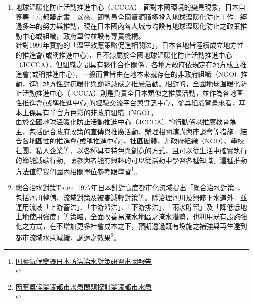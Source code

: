 \documentclass[a4paper,12pt]{article}
\begin{document}
\begin{enumerate}
\item 地球溫暖化防止活動推進中心（JCCCA）
\label{sec:org3282081}
面對本國環境的變異現象，日本自簽署「京都議定書」以來，即動員全國資源積極投入地球溫暖化防止工作，經過多年的努力與推動，現在日本國內各大城市均設有地球溫暖化防止之政策推動中心或組織，政府單位並設有專責機構。\\

針對1999年實施的「溫室效應策略促進相關法」，日本各地皆陸續成立地方性的推進會(或稱推進中心)，且不隸屬於全國地球溫暖化防止活動推進中心（JCCCA），但組織之間具有夥伴合作關係。各地方政府依規定在地方成立推進會(或稱推進中心)，一般而言皆由在地本來就存在的非政府組織（NGO）推動，進行地方性對抗暖化與節能減碳之推廣活動。相對的，全國地球溫暖化防止活動推進中心（JCCCA）則是負責全日本類似之推廣活動，並作為各地區性推進會(或稱推進中心)的經驗交流平台與資訊中心，從其組織背景來看，基本上係具有半官方色彩的非政府組織（NGO）。\\

由於全國地球溫暖化防止活動推進中心（JCCCA）的行動係以推廣教育為主，包括配合政府政策的宣傳與推廣活動、辦理相關演講與座談會等措施，結合各地區性的推進會(或稱推進中心)、社區團體、非政府組織（NGO）、學校社團、私人企業等，以各種具有特色與創意的方式，且可以從生活中確實執行的節能減碳行動，讓參與者能有興趣的可以從活動中學習各種知識，這種推動方法值得我們國內相關單位參考跟學習\footnote{\href{https://www.google.com/url?sa=t\&rct=j\&q=\&esrc=s\&source=web\&cd=\&ved=2ahUKEwib2OL31MLvAhVyF6YKHcy4Cp4QFjABegQIBhAD\&url=https\%3A\%2F\%2Fws.ndc.gov.tw\%2FDownload.ashx\%3Fu\%3DLzAwMS9hZG1pbmlzdHJhdG9yLzEwL3JlbGZpbGUvNTY1OC80MjUxLzgyOTIyN2QzLTA4MDYtNDBjYS04MGMwLTQyMzA3MmZjM2I3ZC5wZGY\%253D\%26n\%3DOTgwNzA15Zug5oeJ5rCj5YCZ6K6K6YG35pel5pys6Ziy5rSq5rK75rC05bCN562WLnBkZg\%253D\%253D\%26icon\%3D..pdf\&usg=AOvVaw2xKxAX\_XQpcGVM6dD17x9d}{因應氣候變遷日本防洪治水對策研習出國報告}\\\label{org57dc3d8}}。\\

\item 總合治水對策\hfill{}\textsc{Taipei}
\label{sec:orgdd90044}
1977年日本針對高度都市化流域提出「總合治水對策」，包括河川整備、流域對策及被害減輕對策等。除治理河川及興修下水道外，並運用流域「上游蓄洪」、「中游滯洪」、「下游排洪」、「雨水貯留」及「降低低地土地使用強度」等策略，全面改善易淹水地區之淹水潛勢，也利用既有設施強化之方式，在不增加更多社會成本之下，預期透過既有設施之補強與再生達到都市流域水患減緩、調適之效果\footnote{\href{https://www.google.com/url?sa=t\&rct=j\&q=\&esrc=s\&source=web\&cd=\&ved=2ahUKEwiT6crnt7zvAhWhF6YKHZw8BAwQFjABegQIAhAD\&url=https\%3A\%2F\%2Fws.ndc.gov.tw\%2FDownload.ashx\%3Fu\%3DLzAwMS9hZG1pbmlzdHJhdG9yLzEwL3JlbGZpbGUvNTY0NC8zMjcxLzAwNTg5NTNfMS5wZGY\%253D\%26n\%3DMjAxMjA4MjcxNTQ2MjE3Mjc0NTc3LnBkZg\%253D\%253D\%26icon\%3D..pdf\&usg=AOvVaw18hKOrOs--51JlqZQSVdDY}{因應氣候變遷都市水患問題探討變遷都市水患}\\\label{org80567d6}}。\\


\end{enumerate}
\end{document}
